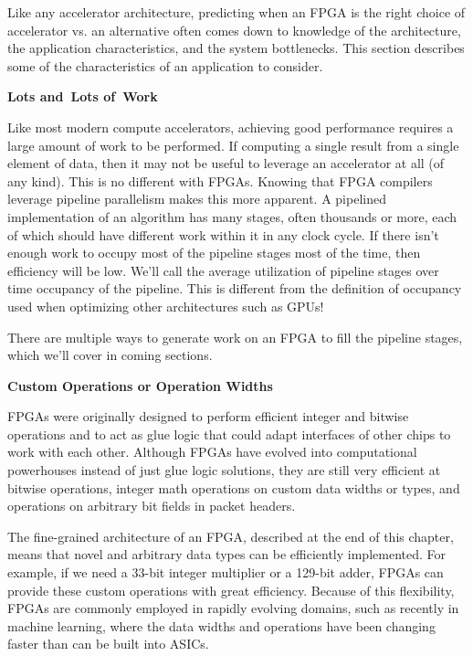 Like any accelerator architecture, predicting when an FPGA is the right choice of accelerator vs. an alternative often comes down to knowledge of the architecture, the application characteristics, and the system bottlenecks. This section describes some of the characteristics of an application to consider.\par

\hspace*{\fill} \par %
\textbf{Lots and Lots of Work}

Like most modern compute accelerators, achieving good performance requires a large amount of work to be performed. If computing a single result from a single element of data, then it may not be useful to leverage an accelerator at all (of any kind). This is no different with FPGAs. Knowing that FPGA compilers leverage pipeline parallelism makes this more apparent. A pipelined implementation of an algorithm has many stages, often thousands or more, each of which should have different work within it in any clock cycle. If there isn’t enough work to occupy most of the pipeline stages most of the time, then efficiency will be low. We’ll call the average utilization of pipeline stages over time occupancy of the pipeline. This is different from the definition of occupancy used when optimizing other architectures such as GPUs!\par

There are multiple ways to generate work on an FPGA to fill the pipeline stages, which we’ll cover in coming sections.\par

\hspace*{\fill} \par %
\textbf{Custom Operations or Operation Widths}

FPGAs were originally designed to perform efficient integer and bitwise operations and to act as glue logic that could adapt interfaces of other chips to work with each other. Although FPGAs have evolved into computational powerhouses instead of just glue logic solutions, they are still very efficient at bitwise operations, integer math operations on custom data widths or types, and operations on arbitrary bit fields in packet headers.\par

The fine-grained architecture of an FPGA, described at the end of this chapter, means that novel and arbitrary data types can be efficiently implemented. For example, if we need a 33-bit integer multiplier or a 129-bit adder, FPGAs can provide these custom operations with great efficiency. Because of this flexibility, FPGAs are commonly employed in rapidly evolving domains, such as recently in machine learning, where the data widths and operations have been changing faster than can be built into ASICs.\par

